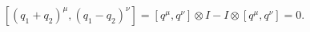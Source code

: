\begin{equation}
\label{tensor}
\left[(q_1+q_2)^\mu,(q_1-q_2)^\nu\right]=
[q^\mu,q^\nu]\otimes I-
I\otimes[q^\mu,q^\nu]= 0.
\end{equation}

